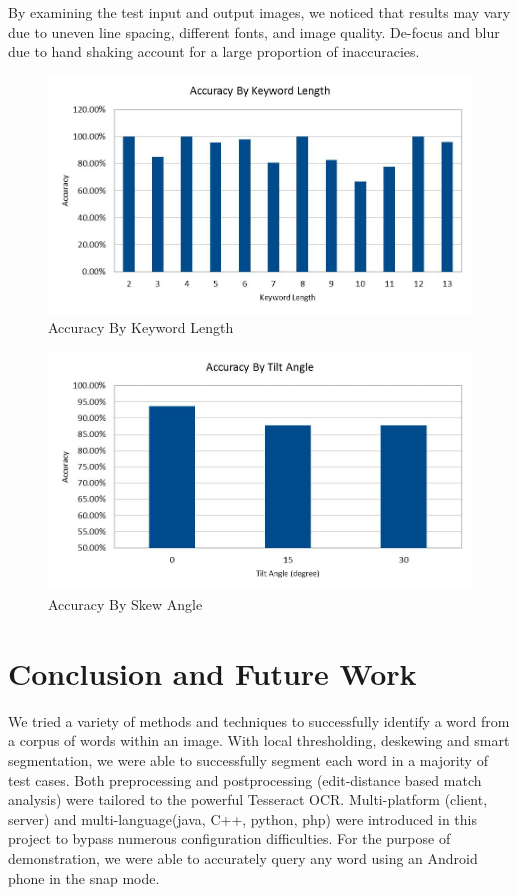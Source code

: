 \documentclass[conference]{IEEEtran}
\begin{document}
By examining the test input and output images, we noticed that results may vary due to uneven line spacing, different fonts, and image quality.  De-focus and blur due to hand shaking account for a large proportion of inaccuracies.

\begin{figure}
\center
\includegraphics[scale=0.25]{accuracy_by_length.jpg}
\caption{Accuracy By Keyword Length}
\label{accuracybylength}
\end{figure}

\begin{figure}
\center
\includegraphics[scale=0.25]{accuracy_by_angle.jpg}
\caption{Accuracy By Skew Angle}
\label{accuracybyangle}
\end{figure}

\section{Conclusion and Future Work}
We tried a variety of methods and techniques to successfully identify a word from a corpus of words within an image. With local thresholding, deskewing and smart segmentation, we were able to successfully segment each word in a majority of test cases. Both preprocessing and postprocessing (edit-distance based match analysis) were tailored to the powerful Tesseract OCR. Multi-platform (client, server) and multi-language(java, C++, python, php) were introduced in this project to bypass numerous configuration difficulties. For the purpose of demonstration, we were able to accurately query any word using an Android phone in the snap mode.
\end{document}
